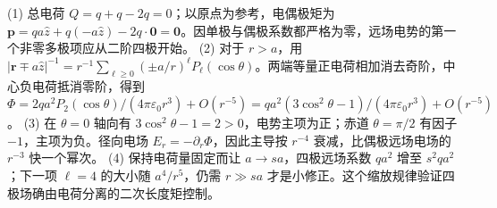 (1) 总电荷 \(Q=q+q-2q=0\)；以原点为参考，电偶极矩为 \(\mathbf p=q a\hat z+q(-a\hat z)-2q\cdot\mathbf0=\mathbf0\)。因单极与偶极系数都严格为零，远场电势的第一个非零多极项应从二阶四极开始。
(2) 对于 \(r>a\)，用 \(|\mathbf r\mp a\hat z|^{-1}=r^{-1}\sum_{\ell\ge0}(\pm a/r)^\ell P_\ell(\cos\theta)\)。两端等量正电荷相加消去奇阶，中心负电荷抵消零阶，得到 \(\Phi=2qa^2P_2(\cos\theta)/(4\pi\varepsilon_0r^3)+O(r^{-5})=qa^2(3\cos^2\theta-1)/(4\pi\varepsilon_0r^3)+O(r^{-5})\)。
(3) 在 \(\theta=0\) 轴向有 \(3\cos^2\theta-1=2>0\)，电势主项为正；赤道 \(\theta=\pi/2\) 有因子 \(-1\)，主项为负。径向电场 \(E_r=-\partial_r\Phi\)，因此主导按 \(r^{-4}\) 衰减，比偶极远场电场的 \(r^{-3}\) 快一个幂次。
(4) 保持电荷量固定而让 \(a\to sa\)，四极远场系数 \(qa^2\) 增至 \(s^2qa^2\)；下一项 \(\ell=4\) 的大小随 \(a^4/r^5\)，仍需 \(r\gg sa\) 才是小修正。这个缩放规律验证四极场确由电荷分离的二次长度矩控制。
